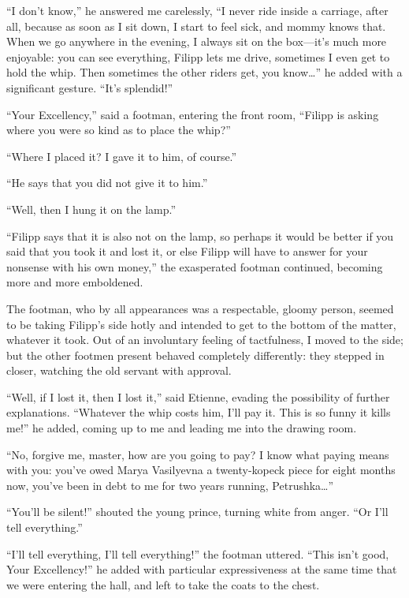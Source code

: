 ``I don't know,'' he answered me carelessly, ``I never ride inside a carriage, after all, because as soon as I sit down, I start to feel sick, and mommy knows that. When we go anywhere in the evening, I always sit on the box---it's much more enjoyable: you can see everything, Filipp lets me drive, sometimes I even get to hold the whip. Then sometimes the other riders get, you know\ldots{}'' he added with a significant gesture. ``It's splendid!'' %

``Your Excellency,'' said a footman, entering the front room, ``Filipp is asking where you were so kind as to place the whip?'' %

``Where I placed it? I gave it to him, of course.'' %

``He says that you did not give it to him.'' %

``Well, then I hung it on the lamp.'' %

``Filipp says that it is also not on the lamp, so perhaps it would be better if you said that you took it and lost it, or else Filipp will have to answer for your nonsense with his own money,'' the exasperated footman continued, becoming more and more emboldened. %

The footman, who by all appearances was a respectable, gloomy person, seemed to be taking Filipp's side hotly and intended to get to the bottom of the matter, whatever it took. Out of an involuntary feeling of tactfulness, I moved to the side; but the other footmen present behaved completely differently: they stepped in closer, watching the old servant with approval.

``Well, if I lost it, then I lost it,'' said Etienne, evading the possibility of further explanations. ``Whatever the whip costs him, I'll pay it. This is so funny it kills me!'' he added, coming up to me and leading me into the drawing room. %

``No, forgive me, master, how are you going to pay? I know what paying means with you: you've owed Marya Vasilyevna a twenty-kopeck piece for eight months now, you've been in debt to me for two years running, Petrushka\ldots{}'' %

``You'll be silent!'' shouted the young prince, turning white from anger. ``Or I'll tell everything.'' %

``I'll tell everything, I'll tell everything!'' the footman uttered. ``This isn't good, Your Excellency!'' he added with particular expressiveness at the same time that we were entering the hall, and left to take the coats to the chest.

